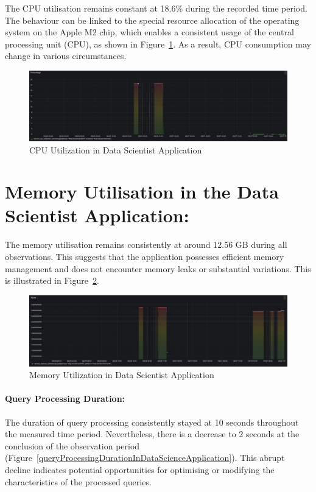\documentclass[preprint,12pt]{elsarticle}
\begin{document}
The CPU utilisation remains constant at 18.6\% during the recorded time period. The behaviour can be linked to the special resource allocation of the operating system on the Apple M2 chip, which enables a consistent usage of the central processing unit (CPU), as shown in Figure~\ref{cpuUtilizationInDataScientistApplication}. As a result, CPU consumption may change in various circumstances.

\begin{figure}[h]
  \centering
  \includegraphics[width=\textwidth]{images/CPU-utilization-data-scientist-application.png}
  \caption{CPU Utilization in Data Scientist Application}
  \label{cpuUtilizationInDataScientistApplication}
\end{figure}

\section{Memory Utilisation in the Data Scientist Application:}
The memory utilisation remains consistently at around 12.56 GB during all observations. This suggests that the application possesses efficient memory management and does not encounter memory leaks or substantial variations. This is illustrated in Figure~\ref{memoryUtilizationInDataScientistApplication}.


\begin{figure}[h]
  \centering
  \includegraphics[width=\textwidth]{images/memory-utilization-in-data-scientist-application.png}
  \caption{Memory Utilization in Data Scientist Application}
  \label{memoryUtilizationInDataScientistApplication}
\end{figure}

\paragraph{Query Processing Duration:}
The duration of query processing consistently stayed at 10 seconds throughout the measured time period. Nevertheless, there is a decrease to 2 seconds at the conclusion of the observation period (Figure~\ref{queryProcessingDurationInDataScienceApplication}). This abrupt decline indicates potential opportunities for optimising or modifying the characteristics of the processed queries.
\end{document}

